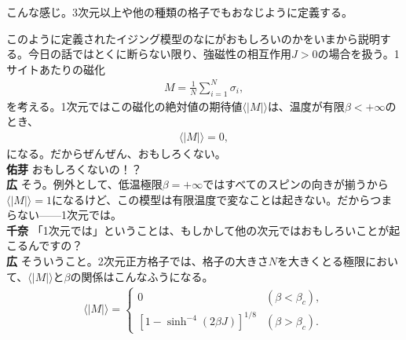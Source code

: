 \documentclass[paper=b5j,fontsize=12Q,jafontsize=12Q,baselineskip=21Q]{jlreq}
\DeclareRobustCommand{\hiron}{\textbf{広 }}
\DeclareRobustCommand{\chinan}{\textbf{千奈 }}
\DeclareRobustCommand{\umen}{\textbf{佑芽 }}
\begin{document}
\begin{refsection}

こんな感じ。3次元以上や他の種類の格子でもおなじように定義する。

このように定義されたイジング模型のなにがおもしろいのかをいまから説明する。今日の話ではとくに断らない限り、強磁性の相互作用$J>0$の場合を扱う。1サイトあたりの磁化
\begin{align}
  M=\frac1N\sum_{i=1}^N\sigma_i,
\end{align}
を考える。1次元ではこの磁化の絶対値の期待値$\langle|M|\rangle$は、温度が有限$\beta<+\infty$のとき、
\begin{align}
  \langle|M|\rangle=0,
\end{align}
になる。だからぜんぜん、おもしろくない。
\\\umen おもしろくないの！？
\\\hiron そう。例外として、低温極限$\beta=+\infty$ではすべてのスピンの向きが揃うから$\langle|M|\rangle=1$になるけど、この模型は有限温度で変なことは起きない。だからつまらない------1次元では。
\\\chinan 「1次元では」ということは、もしかして他の次元ではおもしろいことが起こるんですの？
\\\hiron そういうこと。2次元正方格子では、格子の大きさ$N$を大きくとる極限において、$\langle|M|\rangle$と$\beta$の関係はこんなふうになる。
\begin{align}
  \langle|M|\rangle=
  \begin{cases}
    0 & (\beta < \beta_c),\\
    \left[1-\sinh^{-4}(2\beta J)\right]^{1/8} & (\beta > \beta_c).
  \end{cases}\label{eq:spontaneous_magnetisation_2d_square_ising}
\end{align}


\end{refsection}
\end{document}
